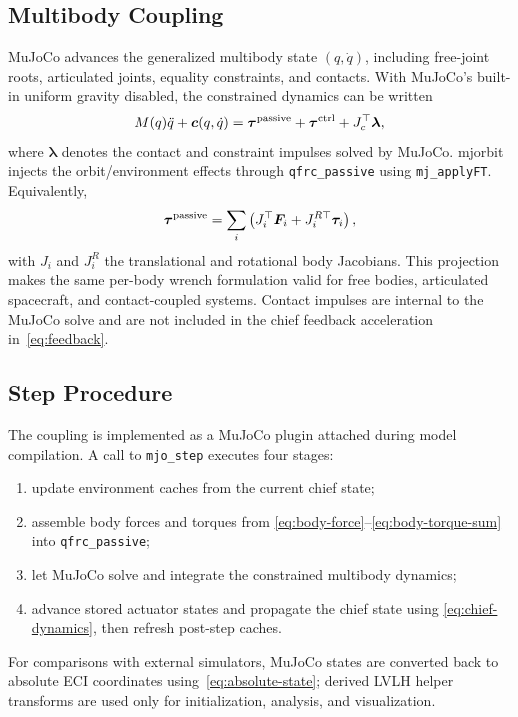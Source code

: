 \documentclass[11pt]{article}
\newcommand{\mjorbit}{mjorbit}
\newcommand{\mj}{MuJoCo}
\begin{document}
\subsection{Multibody Coupling}
\label{subsec:multibody-coupling}

\mj{} advances the generalized multibody state $(q,\dot q)$, including
free-joint roots, articulated joints, equality constraints, and contacts. With
\mj{}'s built-in uniform gravity disabled, the constrained dynamics can be
written
\begin{equation}
  M(q)\ddot q+\bm c(q,\dot q)
  =\bm\tau^{\rm passive}+\bm\tau^{\rm ctrl}+J_c^\top\bm\lambda,
  \label{eq:mj-dynamics}
\end{equation}
where $\bm\lambda$ denotes the contact and constraint impulses solved by
\mj{}. \mjorbit{} injects the orbit/environment effects through
\texttt{qfrc\_passive} using \texttt{mj\_applyFT}. Equivalently,
\begin{equation}
  \bm\tau^{\rm passive}
  =\sum_i \left(J_i^\top\bm F_i+J_i^{R\top}\bm\tau_i\right),
  \label{eq:passive-projection}
\end{equation}
with $J_i$ and $J_i^R$ the translational and rotational body Jacobians.
This projection makes the same per-body wrench formulation valid for free
bodies, articulated spacecraft, and contact-coupled systems. Contact impulses
are internal to the \mj{} solve and are not included in the chief feedback
acceleration in~\eqref{eq:feedback}.

\subsection{Step Procedure}
\label{subsec:step-procedure}

The coupling is implemented as a \mj{} plugin attached during model
compilation. A call to \texttt{mjo\_step} executes four stages:
\begin{enumerate}\setlength{\itemsep}{0pt}
  \item update environment caches from the current chief state;
  \item assemble body forces and torques from
    \eqref{eq:body-force}--\eqref{eq:body-torque-sum} into
    \texttt{qfrc\_passive};
  \item let \mj{} solve and integrate the constrained multibody dynamics;
  \item advance stored actuator states and propagate the chief state using
    \eqref{eq:chief-dynamics}, then refresh post-step caches.
\end{enumerate}
For comparisons with external simulators, \mj{} states are converted back to
absolute ECI coordinates using~\eqref{eq:absolute-state}; derived LVLH helper
transforms are used only for initialization, analysis, and visualization.
\end{document}
